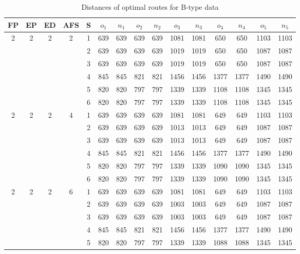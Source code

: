 \begin{longtable}{|c|c|c|c|c|c c|c c|c c|c c|c c|}
\caption{Distances of optimal routes for B-type data}
\label{tab:distance_b} \\
\hline
FP  & EP & ED & AFS & S & $o_1$ & $n_1$ & $o_2$ & $n_2$ & $o_3$ & $n_3$ & $o_4$ & $n_4$ & $o_5$ & $n_5$\\
\hline\hline\multirow{6}{*}{2} & \multirow{6}{*}{2} & \multirow{6}{*}{2} & \multirow{6}{*}{2} & 1 & 639 & 639 & 639 & 639 & 1081 & 1081 & 650 & 650 & 1103 & 1103 \\
 & & & & 2 & 639 & 639 & 639 & 639 & 1019 & 1019 & 650 & 650 & 1087 & 1087 \\
 & & & & 3 & 639 & 639 & 639 & 639 & 1019 & 1019 & 650 & 650 & 1087 & 1087 \\
 & & & & 4 & 845 & 845 & 821 & 821 & 1456 & 1456 & 1377 & 1377 & 1490 & 1490 \\
 & & & & 5 & 820 & 820 & 797 & 797 & 1339 & 1339 & 1108 & 1108 & 1345 & 1345 \\
 & & & & 6 & 820 & 820 & 797 & 797 & 1339 & 1339 & 1108 & 1108 & 1345 & 1345 \\
\hline
\multirow{6}{*}{2} & \multirow{6}{*}{2} & \multirow{6}{*}{2} & \multirow{6}{*}{4} & 1 & 639 & 639 & 639 & 639 & 1081 & 1081 & 649 & 649 & 1103 & 1103 \\
 & & & & 2 & 639 & 639 & 639 & 639 & 1013 & 1013 & 649 & 649 & 1087 & 1087 \\
 & & & & 3 & 639 & 639 & 639 & 639 & 1013 & 1013 & 649 & 649 & 1087 & 1087 \\
 & & & & 4 & 845 & 845 & 821 & 821 & 1456 & 1456 & 1377 & 1377 & 1490 & 1490 \\
 & & & & 5 & 820 & 820 & 797 & 797 & 1339 & 1339 & 1090 & 1090 & 1345 & 1345 \\
 & & & & 6 & 820 & 820 & 797 & 797 & 1339 & 1339 & 1090 & 1090 & 1345 & 1345 \\
\hline
\multirow{6}{*}{2} & \multirow{6}{*}{2} & \multirow{6}{*}{2} & \multirow{6}{*}{6} & 1 & 639 & 639 & 639 & 639 & 1081 & 1081 & 649 & 649 & 1103 & 1103 \\
 & & & & 2 & 639 & 639 & 639 & 639 & 1003 & 1003 & 649 & 649 & 1087 & 1087 \\
 & & & & 3 & 639 & 639 & 639 & 639 & 1003 & 1003 & 649 & 649 & 1087 & 1087 \\
 & & & & 4 & 845 & 845 & 821 & 821 & 1456 & 1456 & 1377 & 1377 & 1490 & 1490 \\
 & & & & 5 & 820 & 820 & 797 & 797 & 1339 & 1339 & 1088 & 1088 & 1345 & 1345 \\

\end{longtable}
